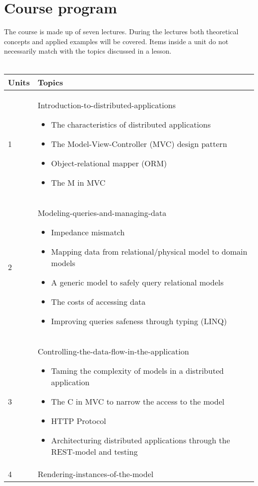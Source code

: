 \section{Course program}
The course is made up of seven lectures. During the lectures both theoretical
concepts and applied examples will be covered. Items inside a unit do not necessarily match with the topics discussed in a lesson. 
	\\
	\\
	\begin{tabular}{ | p{1.2cm} | p{10cm} | }
		\hline
	  	\textbf{Units} & \textbf{Topics} \\
	  	\hline 
  		1 & Introduction-to-distributed-applications
  			\begin{itemize}[nolistsep]
				\item The characteristics of distributed applications
				\item The Model-View-Controller (MVC) design pattern 
				\item Object-relational mapper (ORM)
				\item The M in MVC
			\end{itemize}
 		\\
  		\hline
  		2 & Modeling-queries-and-managing-data
  		\begin{itemize}[nolistsep]
					\item Impedance mismatch
					\item Mapping data from relational/physical model to domain models
					\item A generic model to safely query relational models
					\item The costs of accessing data
					\item Improving queries safeness through typing (LINQ)
				\end{itemize}
  		\\
  		\hline
  		3 & Controlling-the-data-flow-in-the-application
  		\begin{itemize}[nolistsep]
					\item Taming the complexity of models in a distributed application
					\item The C in MVC to narrow the access to the model
					\item HTTP Protocol
					\item Architecturing distributed applications through the REST-model and testing
				\end{itemize}
  		 \\
  		\hline
  		4 &  Rendering-instances-of-the-model

\end{tabular}
